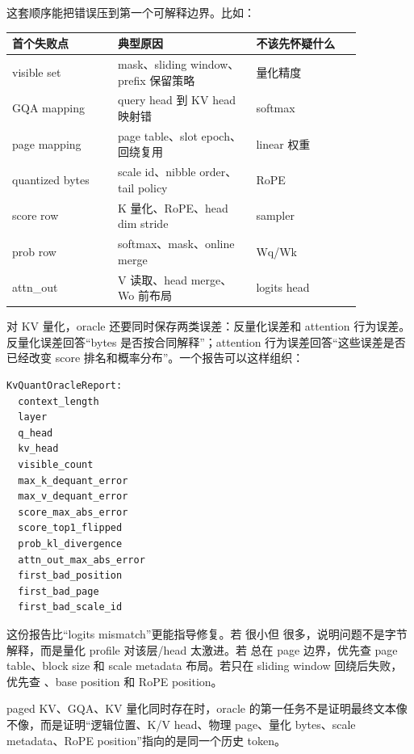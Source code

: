 这套顺序能把错误压到第一个可解释边界。比如：

\begin{center}
\begin{tabular}{p{0.26\linewidth}p{0.34\linewidth}p{0.26\linewidth}}
\toprule
首个失败点 & 典型原因 & 不该先怀疑什么 \\
\midrule
visible set & mask、sliding window、prefix 保留策略 & 量化精度 \\
GQA mapping & query head 到 KV head 映射错 & softmax \\
page mapping & page table、slot epoch、回绕复用 & linear 权重 \\
quantized bytes & scale id、nibble order、tail policy & RoPE \\
score row & K 量化、RoPE、head dim stride & sampler \\
prob row & softmax、mask、online merge & Wq/Wk \\
attn\_out & V 读取、head merge、Wo 前布局 & logits head \\
\bottomrule
\end{tabular}
\end{center}

对 KV 量化，oracle 还要同时保存两类误差：反量化误差和 attention 行为误差。反量化误差回答“bytes 是否按合同解释”；attention 行为误差回答“这些误差是否已经改变 score 排名和概率分布”。一个报告可以这样组织：

\begin{lstlisting}[numbers=none,caption={KV quant oracle report 的核心字段}]
KvQuantOracleReport:
  context_length
  layer
  q_head
  kv_head
  visible_count
  max_k_dequant_error
  max_v_dequant_error
  score_max_abs_error
  score_top1_flipped
  prob_kl_divergence
  attn_out_max_abs_error
  first_bad_position
  first_bad_page
  first_bad_scale_id
\end{lstlisting}

这份报告比“logits mismatch”更能指导修复。若  很小但  很多，说明问题不是字节解释，而是量化 profile 对该层/head 太激进。若  总在 page 边界，优先查 page table、block size 和 scale metadata 布局。若只在 sliding window 回绕后失败，优先查 、base position 和 RoPE position。

\begin{keyidea}
paged KV、GQA、KV 量化同时存在时，oracle 的第一任务不是证明最终文本像不像，而是证明“逻辑位置、K/V head、物理 page、量化 bytes、scale metadata、RoPE position”指向的是同一个历史 token。
\end{keyidea}

